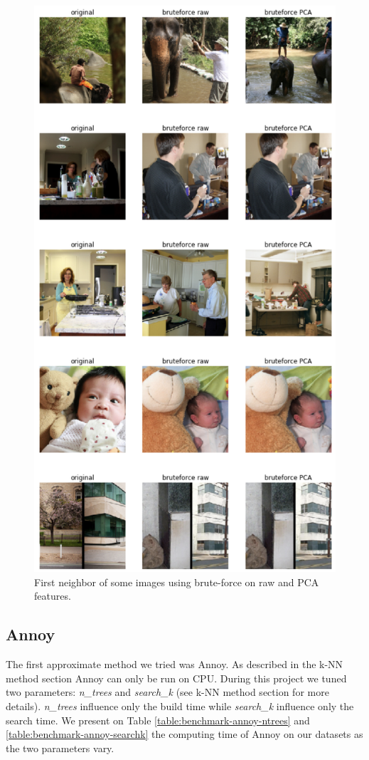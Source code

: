 \documentclass[a4paper]{article}
\begin{document}
\begin{figure}[h]
	\includegraphics[width=\textwidth]{visual-bruteforce}
	\caption{First neighbor of some images using brute-force on raw and PCA features.}
	\label{fig:visual-bruteforce}
\end{figure}


	\subsection{Annoy}
	The first approximate method we tried was Annoy. As described in the k-NN method section Annoy can only be run on CPU. During this project we tuned two parameters: \textit{n\_trees} and \textit{search\_k} (see k-NN method section for more details). \textit{n\_trees} influence only the build time while \textit{search\_k} influence only the search time. We present on Table \ref{table:benchmark-annoy-ntrees} and \ref{table:benchmark-annoy-searchk} the computing time of Annoy on our datasets as the two parameters vary.
	
\end{document}

